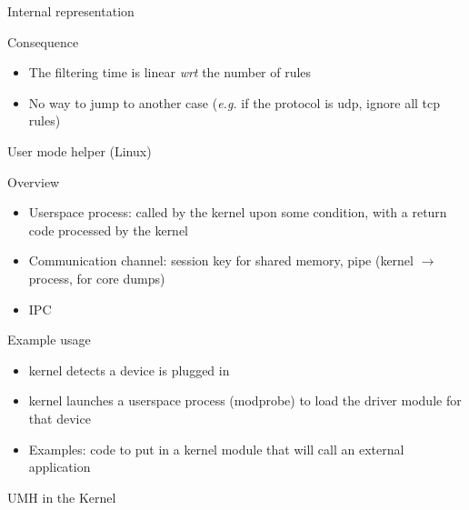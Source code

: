 \begin{reveals}
\begin{frame}[c]{Internal representation}
  \vfill
  
  \begin{block}{Consequence}
    \begin{itemize}
    \item The filtering time is linear \textit{wrt} the number of
      rules
    \item No way to jump to another case (\textit{e.g.} if the
      protocol is udp, ignore all tcp rules)
    \end{itemize}
  \end{block}
\end{frame}


\begin{frame}[c]{User mode helper (Linux)}
  
  \begin{block}{Overview}
    \begin{itemize}
    \item Userspace process: called by the kernel upon some condition,
      with a return code processed by the kernel
    \item Communication channel: session key for shared memory, pipe
      (kernel \(\rightarrow\) process, for core dumps)
    \item IPC
    \end{itemize}
  \end{block}

  \vfill

  \begin{block}{Example usage}
    \begin{itemize}
    \item kernel detects a device is plugged in
    \item kernel launches a userspace process (modprobe) to load the
      driver module for that device
    \item Examples: code to put in a kernel module that will call an
      external application
    \end{itemize}
  \end{block}

\end{frame}


\begin{frame}[c]{UMH in the Kernel}


\end{frame}
\end{reveals}
